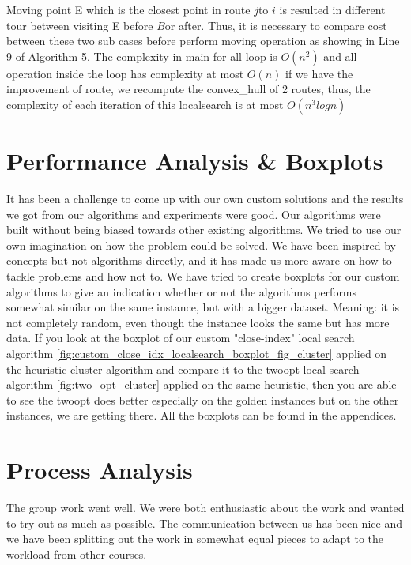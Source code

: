 \documentclass[12pt]{article}
\begin{document}
Moving point E which is the closest point in route \(j\)to \(i\) is resulted in different tour between visiting E before \(B\)or after. Thus, it is necessary to compare cost between these two sub cases before perform moving operation as showing in Line 9 of Algorithm 5. The complexity in main for all loop is $O(n^2)$ and all operation inside the loop has complexity at most $O(n)$ if we have the improvement of route, we recompute the convex\_hull of 2 routes, thus, the complexity of each iteration of this localsearch is at most $O(n^3logn)$

\section{Performance Analysis \& Boxplots}
It has been a challenge to come up with our own custom solutions and the results we got from our algorithms and experiments
were good. Our algorithms were built without being biased towards other existing algorithms. We tried to use our own imagination on how the problem could be solved. 
We have been inspired by concepts but not algorithms directly, and it has made us more aware on how to tackle problems and how not to.
\newline
We have tried to create boxplots for our custom algorithms to give an indication whether or not the algorithms performs somewhat similar on the same instance, but with 
a bigger dataset. Meaning: it is not completely random, even though the instance looks the same but has more data. If you look at the boxplot of our custom "close-index" local search algorithm \- \ref{fig:custom_close_idx_localsearch_boxplot_fig_cluster} \- applied on the heuristic cluster algorithm
and compare it to the two\-opt local search algorithm \- \ref{fig:two_opt_cluster} \- applied on the same heuristic, then you are able to see the two\-opt does better \- especially on the golden instances \- but on the other instances, we are getting there. All the boxplots can be found in the appendices.
\newline



\section{Process Analysis}
The group work went well. We were both enthusiastic about the work and wanted to try out as much as possible. 
The communication between us has been nice and we have been splitting out the work in somewhat equal pieces to adapt to the workload from other courses.
\end{document}
